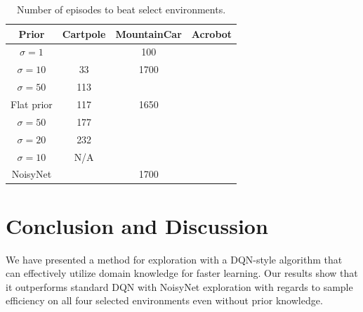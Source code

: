 \documentclass[]{uai2022} %
\begin{document}
\begin{table}
    \centering
    \caption{Number of episodes to beat select environments.}\label{tab:prior_results}
    \begin{tabular}{cccc}
        \toprule
        Prior & Cartpole & MountainCar & Acrobot\\
        \midrule
        \(\sigma = 1\)  & \tB 14  & 100 &\\
        \(\sigma = 10\) &     33  & 1700 &\\
        \(\sigma = 50\) &     113 & &\\
        Flat prior      &     117 & 1650 &\\
        \(\sigma = 50\) &     177 & &\\
        \(\sigma = 20\) &     232 & &\\
        \(\sigma = 10\) &     N/A & &\\
        \midrule
        NoisyNet        &         & 1700 &\\
        \bottomrule
    \end{tabular}
\end{table}





\section{Conclusion and Discussion}
We have presented a method for exploration with a DQN-style algorithm that can
effectively utilize domain knowledge for faster learning. Our results show that
it outperforms standard DQN with NoisyNet exploration with regards to sample efficiency
on all four selected environments even without prior knowledge.
\end{document}
